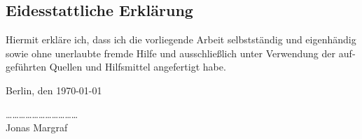 
\begin{otherlanguage}{ngerman}
\section*{Eidesstattliche Erklärung}
\vspace{1cm}
Hiermit erkläre ich, dass ich die vorliegende Arbeit selbstständig und
eigenhändig sowie ohne unerlaubte fremde Hilfe und ausschließlich unter
Verwendung der aufgeführten Quellen und Hilfsmittel angefertigt habe.

\bigskip

\noindent
Berlin, den \today\par
\vspace{2cm}
\noindent\ldots\ldots\ldots\ldots\ldots\ldots\ldots\ldots\ldots\ldots\ldots\\
Jonas Margraf
\newpage
\end{otherlanguage}
